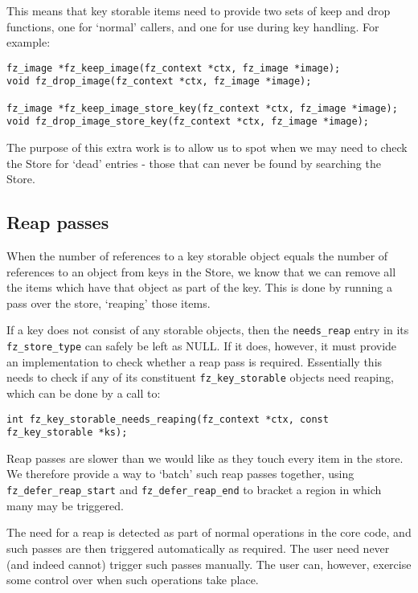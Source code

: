 \documentclass[oneside]{book}
\begin{document}
This means that key storable items need to provide two sets of keep and drop functions, one for `normal' callers, and one for use during key handling. For example:

\begin{lstlisting}
fz_image *fz_keep_image(fz_context *ctx, fz_image *image);
void fz_drop_image(fz_context *ctx, fz_image *image);

fz_image *fz_keep_image_store_key(fz_context *ctx, fz_image *image);
void fz_drop_image_store_key(fz_context *ctx, fz_image *image);
\end{lstlisting}

The purpose of this extra work is to allow us to spot when we may need to check the Store for `dead' entries - those that can never be found by searching the Store.

\subsection{Reap passes}

When the number of references to a key storable object equals the number of references to an object from keys in the Store, we know that we can remove all the items which have that object as part of the key. This is done by running a pass over the store, `reaping' those items.

If a key does not consist of any storable objects, then the \texttt{needs\_reap} entry in its \texttt{fz\_store\_type} can safely be left as NULL. If it does, however, it must provide an implementation to check whether a reap pass is required. Essentially this needs to check if any of its constituent \texttt{fz\_key\_storable} objects need reaping, which can be done by a call to:

\begin{lstlisting}
int fz_key_storable_needs_reaping(fz_context *ctx, const fz_key_storable *ks);
\end{lstlisting}

Reap passes are slower than we would like as they touch every item in the store. We therefore provide a way to `batch' such reap passes together, using \texttt{fz\_defer\_reap\_start} and \texttt{fz\_defer\_reap\_end} to bracket a region in which many may be triggered.

The need for a reap is detected as part of normal operations in the core code, and such passes are then triggered automatically as required. The user need never (and indeed cannot) trigger such passes manually. The user can, however, exercise some control over when such operations take place.
\end{document}
